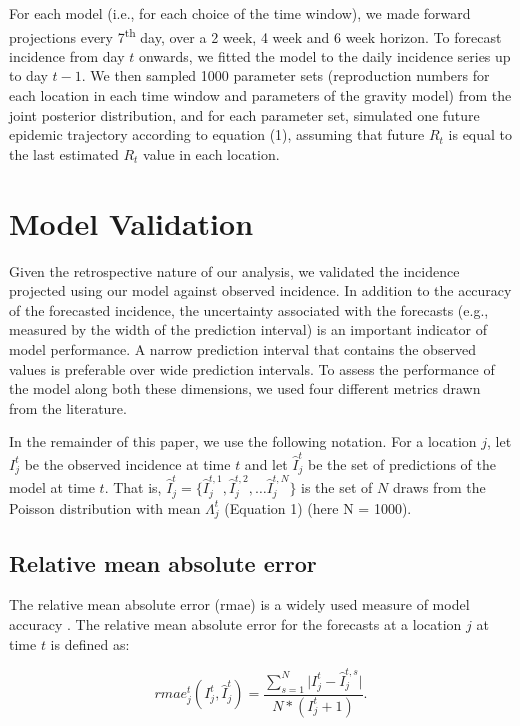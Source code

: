 \documentclass[9pt,twocolumn,twoside,lineno]{pnas-new}
\begin{document}
{For each model (i.e., for each choice of the time window), we made
forward projections every 7\textsuperscript{th} day, over a 2 week, 4
week and 6 week horizon. To forecast incidence from day \(t\) onwards,
we fitted the model to the daily incidence series up to day \(t-1\). We
then sampled 1000 parameter sets (reproduction numbers for each location
in each time window and parameters of the gravity model) from the joint
posterior distribution, and for each parameter set, simulated one future
epidemic trajectory according to equation (1), assuming that future
\(R_t\) is equal to the last estimated \(R_t\) value in each location.

\section*{Model Validation}\label{assess}

Given the retrospective nature of our analysis, we validated the
incidence projected using our model against observed incidence. In
addition to the accuracy of the forecasted incidence, the uncertainty
associated with the forecasts (e.g., measured by the width of the
prediction interval) is an important indicator of model performance. A
narrow prediction interval that contains the observed values is
preferable over wide prediction intervals. To assess the performance of
the model along both these dimensions, we used four different metrics
drawn from the literature.

In the remainder of this paper, we use the following notation. For a
location \(j\), let \(I_{j}^{t}\) be the observed incidence at time $t$
and let $\hat{I}_{j}^{t}$ be the set of predictions of the
model at time \(t\). That is, $\hat{I}_{j}^{t}= \{\hat{I}_{j}^{t, 1}, \hat{I}_{j}^{t, 2}, \dots \hat{I}_{j}^{t,N}\}$
is the set of \(N\) draws from the Poisson distribution with mean
\(\Lambda_{j}^{t}\) (Equation 1) (here N = 1000).



\subsection*{Relative mean absolute error}\label{relative-mean-absolute-error}

The relative mean absolute error (rmae) is a widely used measure of
model accuracy \cite{tofallis2015better}. The relative mean absolute
error for the forecasts at a location \(j\) at time \(t\) is defined as:

\begin{equation*}
  rmae_{j}^{t}(I_{j}^{t}, \hat{I}_{j}^{t}) = 
 \frac{
 \sum_{s = 1}^N{\lvert I_{j}^{t} - \hat{I}_{j}^{t, s} \rvert}
 }
 { N *  (I_{j}^{t} + 1)}.
\end{equation*}

}
\end{document}
